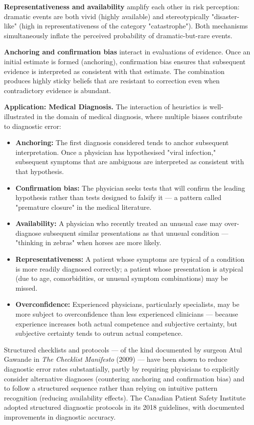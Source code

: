 \documentclass[12pt, letterpaper]{article}
\begin{document}
\textbf{Representativeness and availability} amplify each other in risk perception: dramatic events are both vivid (highly available) and stereotypically "disaster-like" (high in representativeness of the category "catastrophe"). Both mechanisms simultaneously inflate the perceived probability of dramatic-but-rare events.

\textbf{Anchoring and confirmation bias} interact in evaluations of evidence. Once an initial estimate is formed (anchoring), confirmation bias ensures that subsequent evidence is interpreted as consistent with that estimate. The combination produces highly sticky beliefs that are resistant to correction even when contradictory evidence is abundant.

\textbf{Application: Medical Diagnosis.} The interaction of heuristics is well-illustrated in the domain of medical diagnosis, where multiple biases contribute to diagnostic error:

\begin{itemize}
\item \textbf{Anchoring:} The first diagnosis considered tends to anchor subsequent interpretation. Once a physician has hypothesised "viral infection," subsequent symptoms that are ambiguous are interpreted as consistent with that hypothesis.
\item \textbf{Confirmation bias:} The physician seeks tests that will confirm the leading hypothesis rather than tests designed to falsify it --- a pattern called "premature closure" in the medical literature.
\item \textbf{Availability:} A physician who recently treated an unusual case may over-diagnose subsequent similar presentations as that unusual condition --- "thinking in zebras" when horses are more likely.
\item \textbf{Representativeness:} A patient whose symptoms are typical of a condition is more readily diagnosed correctly; a patient whose presentation is atypical (due to age, comorbidities, or unusual symptom combinations) may be missed.
\item \textbf{Overconfidence:} Experienced physicians, particularly specialists, may be more subject to overconfidence than less experienced clinicians --- because experience increases both actual competence and subjective certainty, but subjective certainty tends to outrun actual competence.
\end{itemize}

Structured checklists and protocols --- of the kind documented by surgeon Atul Gawande in \textit{The Checklist Manifesto} (2009) --- have been shown to reduce diagnostic error rates substantially, partly by requiring physicians to explicitly consider alternative diagnoses (countering anchoring and confirmation bias) and to follow a structured sequence rather than relying on intuitive pattern recognition (reducing availability effects). The Canadian Patient Safety Institute adopted structured diagnostic protocols in its 2018 guidelines, with documented improvements in diagnostic accuracy.
\end{document}
